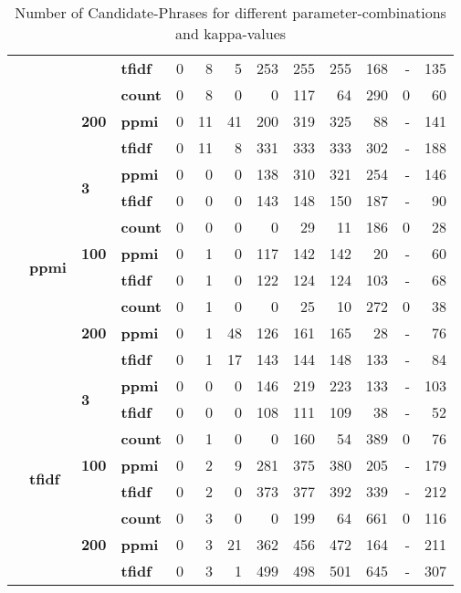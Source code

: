 \begin{table}[h]
{\begin{tabular}{llllrrrrrrrrr}
	 &  &  & \textbf{tfidf} & 0 & 8 & 5 & 253 & 255 & 255 & 168 & - & 135 \\
	\cline{3-4}
	 &  & \multirow[t]{3}{*}{\textbf{200}} & \textbf{count} & 0 & 8 & 0 & 0 & 117 & 64 & 290 & 0 & 60 \\
	 &  &  & \textbf{ppmi} & 0 & {\cellcolor{lightgreen}} 11 & 41 & 200 & 319 & 325 & 88 & - & 141 \\
	 &  &  & \textbf{tfidf} & 0 & {\cellcolor{lightgreen}} 11 & 8 & 331 & 333 & 333 & 302 & - & 188 \\
	\cline{2-4} \cline{3-4}
	 & \multirow[t]{8}{*}{\textbf{ppmi}} & \multirow[t]{2}{*}{\textbf{3}} & \textbf{ppmi} & 0 & 0 & 0 & 138 & 310 & 321 & 254 & - & 146 \\
	 &  &  & \textbf{tfidf} & 0 & 0 & 0 & 143 & 148 & 150 & 187 & - & 90 \\
	\cline{3-4}
	 &  & \multirow[t]{3}{*}{\textbf{100}} & \textbf{count} & 0 & 0 & 0 & 0 & 29 & 11 & 186 & 0 & 28 \\
	 &  &  & \textbf{ppmi} & 0 & 1 & 0 & 117 & 142 & 142 & 20 & - & 60 \\
	 &  &  & \textbf{tfidf} & 0 & 1 & 0 & 122 & 124 & 124 & 103 & - & 68 \\
	\cline{3-4}
	 &  & \multirow[t]{3}{*}{\textbf{200}} & \textbf{count} & 0 & 1 & 0 & 0 & 25 & 10 & 272 & 0 & 38 \\
	 &  &  & \textbf{ppmi} & 0 & 1 & 48 & 126 & 161 & 165 & 28 & - & 76 \\
	 &  &  & \textbf{tfidf} & 0 & 1 & 17 & 143 & 144 & 148 & 133 & - & 84 \\
	\cline{2-4} \cline{3-4}
	 & \multirow[t]{8}{*}{\textbf{tfidf}} & \multirow[t]{2}{*}{\textbf{3}} & \textbf{ppmi} & 0 & 0 & 0 & 146 & 219 & 223 & 133 & - & 103 \\
	 &  &  & \textbf{tfidf} & 0 & 0 & 0 & 108 & 111 & 109 & 38 & - & 52 \\
	\cline{3-4}
	 &  & \multirow[t]{3}{*}{\textbf{100}} & \textbf{count} & 0 & 1 & 0 & 0 & 160 & 54 & 389 & 0 & 76 \\
	 &  &  & \textbf{ppmi} & 0 & 2 & 9 & 281 & 375 & 380 & 205 & - & 179 \\
	 &  &  & \textbf{tfidf} & 0 & 2 & 0 & 373 & 377 & 392 & 339 & - & 212 \\
	\cline{3-4}
	 &  & \multirow[t]{3}{*}{\textbf{200}} & \textbf{count} & 0 & 3 & 0 & 0 & 199 & 64 & 661 & 0 & 116 \\
	 &  &  & \textbf{ppmi} & 0 & 3 & 21 & 362 & 456 & 472 & 164 & - & 211 \\
	 &  &  & \textbf{tfidf} & 0 & 3 & 1 & 499 & 498 & 501 & 645 & - & 307 \\
	\bottomrule
	\end{tabular}
	}
	\caption{Number of Candidate-Phrases for different parameter-combinations and kappa-values \label{tab:kappa_table}}
	\label{tab:cands_per_config}
\end{table}
